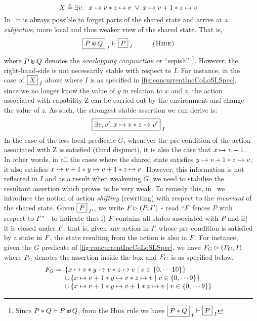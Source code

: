 %
\[
	X \triangleq \exists v.\,\;\; x \mapsto v * z \mapsto v \;\lor\; x \mapsto v+1 * z \mapsto v
\]
%
In \colosl\ it is always possible to forget parts of the shared state and arrive at a \emph{subjective}, more local and thus weaker view of the shared state. That is,
%
\[
	\shared{P \sepish Q}{I} \vdash \shared{P}{I} \hspace*{1cm} \textsc{(Hide)}
\]
%
where $P \sepish Q$ denotes the \emph{overlapping conjunction} or ``sepish'' \cite{}\footnote{Since $P * Q \vdash P \sepish Q$, from the \textsc{Hide} rule we have $\boxed{P * Q}_{\; I} \vdash \boxed{P}_{\; I}$}. However, the right-hand-side is not necessarily stable with respect to $I$. For instance, in the case of $\boxed{X}_{\; I}$ above where $I$ is as specified in \fig\ref{fig:concurrentIncCoLoSLSpec}, since we no longer know the value of $y$ in relation to $x$ and $z$, the action associated with capability \textsf{Z} can be carried out by the environment and change the value of $z$. As such, the strongest stable assertion we can derive is: 
%
\[
	\boxed{\exists v, v'.\,  x \mapsto v * z \mapsto v'}_{\; I}
\]
%
In the case of the less local predicate $G$, whenever the pre-condition of the action associated with \textsf{Z} is satisfied (third disjunct), it is also the case that $x \mapsto v+1$. In other words, in all the cases where the shared state satisfies $y \mapsto v+1 * z \mapsto v$, it also satisfies $x \mapsto v+1 * y \mapsto v+1 * z \mapsto v$. However, this information is not reflected in $I$ and as a result when weakening $G$, we need to stabilise the resultant assertion which proves to be very weak. To remedy this, in \colosl\ we introduce the notion of action \emph{shifting} (rewriting) with respect to the \emph{invariant} of the shared state. Given $\boxed{P}_{\; I'}$, we write $F_{} \rhd (P, I')$ - read ``$F_{}$ fences $P$ with respect to $I'$'' - to indicate that i) $F_{}$ contains all states associated with $P$ and ii) it is closed under $I'$; that is, given any action in $I'$ whose pre-condition is satisfied by a state in $F_{}$, the state resulting from the action is also in $F_{}$. For instance, given the $G$ predicate of \fig\ref{fig:concurrentIncCoLoSLSpec}, we have $F_{G} \rhd (P_G, I)$ where $P_G$ denotes the assertion inside the box and $F_{G}$ is as specified below.
%
\[
	\begin{array}{l l}
		F_{G} = \hspace*{-5pt}& \left\{x \mapsto v * y \mapsto v * z \mapsto v \;|\; v \in \{0, \cdots 10\} \right\} \\
		& \cup \left\{x \mapsto v+1 * y \mapsto v * z \mapsto v \;|\; v \in \{0, \cdots 9 \} \right\} \\
		& \cup \left\{x \mapsto v+1 * y \mapsto v+1 * z \mapsto v \;|\; v \in \{0, \cdots 9\} \right\}\\
	\end{array}
\]
